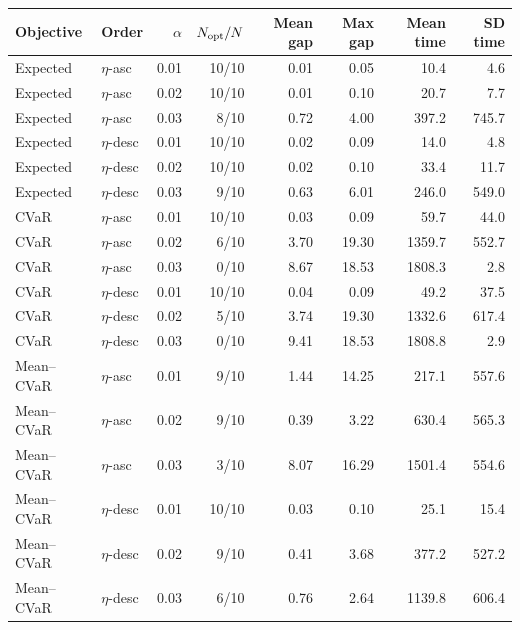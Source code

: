 \begin{tabular}{llrrrrrr}
\toprule
Objective & Order & $\alpha$ & $N_{\rm opt}/N$ & Mean gap & Max gap & Mean time & SD time \\
\midrule
Expected & $\eta$-asc & 0.01 & 10/10 & 0.01 & 0.05 & 10.4 & 4.6 \\
Expected & $\eta$-asc & 0.02 & 10/10 & 0.01 & 0.10 & 20.7 & 7.7 \\
Expected & $\eta$-asc & 0.03 & 8/10 & 0.72 & 4.00 & 397.2 & 745.7 \\
Expected & $\eta$-desc & 0.01 & 10/10 & 0.02 & 0.09 & 14.0 & 4.8 \\
Expected & $\eta$-desc & 0.02 & 10/10 & 0.02 & 0.10 & 33.4 & 11.7 \\
Expected & $\eta$-desc & 0.03 & 9/10 & 0.63 & 6.01 & 246.0 & 549.0 \\
\midrule
CVaR & $\eta$-asc & 0.01 & 10/10 & 0.03 & 0.09 & 59.7 & 44.0 \\
CVaR & $\eta$-asc & 0.02 & 6/10 & 3.70 & 19.30 & 1359.7 & 552.7 \\
CVaR & $\eta$-asc & 0.03 & 0/10 & 8.67 & 18.53 & 1808.3 & 2.8 \\
CVaR & $\eta$-desc & 0.01 & 10/10 & 0.04 & 0.09 & 49.2 & 37.5 \\
CVaR & $\eta$-desc & 0.02 & 5/10 & 3.74 & 19.30 & 1332.6 & 617.4 \\
CVaR & $\eta$-desc & 0.03 & 0/10 & 9.41 & 18.53 & 1808.8 & 2.9 \\
\midrule
Mean--CVaR & $\eta$-asc & 0.01 & 9/10 & 1.44 & 14.25 & 217.1 & 557.6 \\
Mean--CVaR & $\eta$-asc & 0.02 & 9/10 & 0.39 & 3.22 & 630.4 & 565.3 \\
Mean--CVaR & $\eta$-asc & 0.03 & 3/10 & 8.07 & 16.29 & 1501.4 & 554.6 \\
Mean--CVaR & $\eta$-desc & 0.01 & 10/10 & 0.03 & 0.10 & 25.1 & 15.4 \\
Mean--CVaR & $\eta$-desc & 0.02 & 9/10 & 0.41 & 3.68 & 377.2 & 527.2 \\
Mean--CVaR & $\eta$-desc & 0.03 & 6/10 & 0.76 & 2.64 & 1139.8 & 606.4 \\
\bottomrule
\end{tabular}
